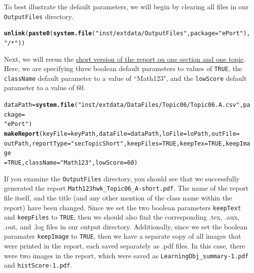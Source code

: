 \documentclass[11pt,a4paper,oldfontcommands,openany]{memoir}
\makeatletter
\newcommand{\hlnum}[1]{\textcolor[rgb]{0.686,0.059,0.569}{#1}}%
\newcommand{\hlstr}[1]{\textcolor[rgb]{0.192,0.494,0.8}{#1}}%
\newcommand{\hlstd}[1]{\textcolor[rgb]{0.345,0.345,0.345}{#1}}%
\newcommand{\hlkwb}[1]{\textcolor[rgb]{0.69,0.353,0.396}{#1}}%
\newcommand{\hlkwc}[1]{\textcolor[rgb]{0.333,0.667,0.333}{#1}}%
\newcommand{\hlkwd}[1]{\textcolor[rgb]{0.737,0.353,0.396}{\textbf{#1}}}%
\newenvironment{kframe}{%
 \def\at@end@of@kframe{}%
 \ifinner\ifhmode%
  \def\at@end@of@kframe{\end{minipage}}%
  \begin{minipage}{\columnwidth}%
 \fi\fi%
 \def\FrameCommand##1{\hskip\@totalleftmargin \hskip-\fboxsep
 \colorbox{shadecolor}{##1}\hskip-\fboxsep
     \hskip-\linewidth \hskip-\@totalleftmargin \hskip\columnwidth}%
 \MakeFramed {\advance\hsize-\width
   \@totalleftmargin\z@ \linewidth\hsize
   \@setminipage}}%
 {\par\unskip\endMakeFramed%
 \at@end@of@kframe}
\newenvironment{knitrout}{}{} %
\numberwithin{equation}{section} %
\makeatother
\begin{document}
To best illustrate the default parameters, we will begin by clearing all files in our \texttt{OutputFiles} directory. \\

\begin{knitrout}
\color{fgcolor}\begin{kframe}
\begin{alltt}
\hlkwd{unlink}\hlstd{(}\hlkwd{paste0}\hlstd{(}\hlkwd{system.file}\hlstd{(}\hlstr{"inst/extdata/OutputFiles"}\hlstd{,} \hlkwc{package} \hlstd{=} \hlstr{"ePort"}\hlstd{),} \hlstr{"/*"}\hlstd{))}
\end{alltt}
\end{kframe}
\end{knitrout}

Next, we will rerun the \hyperref[sec:oneTopicSectionShort]{short version of the report on one section and one topic}. Here, we are specifying three boolean default parameters to values of \texttt{TRUE}, the \texttt{className} default parameter to a value of ``Math123", and the \texttt{lowScore} default parameter to a value of 60. \\

\begin{knitrout}
\color{fgcolor}\begin{kframe}
\begin{alltt}
\hlstd{dataPath} \hlkwb{=} \hlkwd{system.file}\hlstd{(}\hlstr{"inst/extdata/DataFiles/Topic06/Topic06.A.csv"}\hlstd{,} \hlkwc{package} \hlstd{=}
  \hlstr{"ePort"}\hlstd{)}
\hlkwd{makeReport}\hlstd{(}\hlkwc{keyFile} \hlstd{= keyPath,} \hlkwc{dataFile} \hlstd{= dataPath,} \hlkwc{loFile} \hlstd{= loPath,} \hlkwc{outFile} \hlstd{=}
  \hlstd{outPath,} \hlkwc{reportType} \hlstd{=} \hlstr{"secTopicShort"}\hlstd{,} \hlkwc{keepFiles} \hlstd{=} \hlnum{TRUE}\hlstd{,} \hlkwc{keepTex} \hlstd{=} \hlnum{TRUE}\hlstd{,} \hlkwc{keepImage}
  \hlstd{=} \hlnum{TRUE}\hlstd{,} \hlkwc{className} \hlstd{=} \hlstr{"Math123"}\hlstd{,} \hlkwc{lowScore} \hlstd{=} \hlnum{60}\hlstd{)}
\end{alltt}
\end{kframe}
\end{knitrout}

If you examine the \texttt{OutputFiles} directory, you should see that we successfully generated the report \texttt{Math123hwk\_Topic06\_A-short.pdf}. The name of the report file itself, and the title (and any other mention of the class name within the report) have been changed. Since we set the two boolean parameters \texttt{keepText} and \texttt{keepFiles} to \texttt{TRUE}, then we should also find the corresponding .tex, .aux, .out, and .log files in our output directory. Additionally, since we set the boolean paramater \texttt{keepImage} to \texttt{TRUE}, then we have a separate copy of all images that were printed in the report, each saved separately as .pdf files. In this case, there were two images in the report, which were saved as \texttt{LearningObj\_summary-1.pdf} and \texttt{histScore-1.pdf}.
\end{document}
